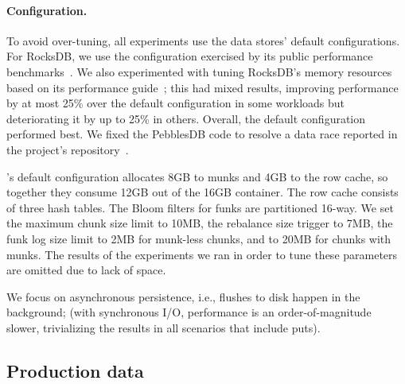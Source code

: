 \paragraph{Configuration.} 
To avoid over-tuning, all experiments use the data stores' default configurations. For RocksDB, we use the configuration exercised by its public 
performance benchmarks~\cite{RocksDBPerf}. 
We also experimented with tuning RocksDB's memory resources based on its performance guide~\cite{RocksDBMemoryTuning}; 
this had mixed results, improving performance by at most 25\% over the default configuration in some workloads but 
deteriorating it by up to 25\% in others. Overall, the default configuration performed best. 
We fixed the PebblesDB code to resolve a data race reported in the project's repository~\cite{pebbles-git-issue}. 

\sys's default configuration 
allocates 8GB to munks and 4GB to the row cache,
so together they consume 12GB out of the 16GB container. 
The row cache consists of three hash tables.  
The Bloom filters for funks are partitioned 16-way.  
We set the \sys\/ maximum chunk size limit to 10MB, the rebalance size trigger to 7MB, 
the funk log size limit to 2MB for munk-less chunks, and to 20MB for chunks with munks. 
The results of the experiments we ran in order to tune these parameters are omitted due to lack of space.

We focus on asynchronous persistence,  i.e., flushes to disk happen in the background; 
(with synchronous I/O, performance is an order-of-magnitude slower, trivializing the results 
in all scenarios that include puts). 

\subsection{Production data}
\label{ssec:prod}



